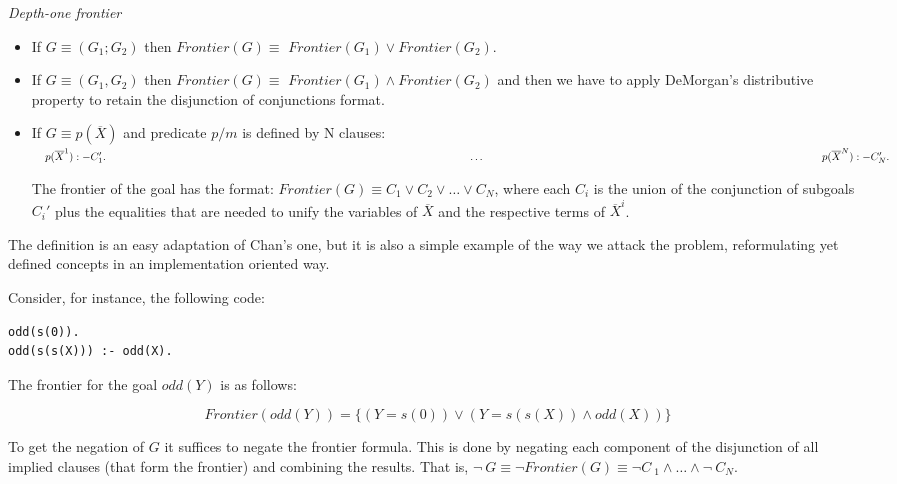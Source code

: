 \documentclass{llncs}
\begin{document}
\begin{definition}{\em Depth-one frontier}

    \begin{itemize} 

\item If $G \equiv (G_1;G_2) $ then $Frontier(G) \equiv$
$Frontier(G_1) \vee Frontier(G_2)$.

\item If $G \equiv (G_1,G_2) $ then $Frontier(G) \equiv$
  $Frontier(G_1) \wedge Frontier(G_2)$ and then we have to apply
  DeMorgan's distributive property to retain the disjunction
  of conjunctions format.
  
\item If $G \equiv p( \overline{X}) $ and 
  predicate $p/m$ is defined by N clauses: $~~~p( \overline{X}^1):- C_1'. \\
~~~~~~~~~~~~~~~~~~~~~~~~~~~~~~~~~~~~~~~~~~~~~~~~~~~~~~~~~~~~~~~~~~~~~~~~~~~~~~~~~~~~~~~~~~~~~~~~~~~~~~\ldots \\
~~~~~~~~~~~~~~~~~~~~~~~~~~~~~~~~~~~~~~~~~~~~~~~~~~~~~~~~~~~~~~~~~~~~~~~~~~~~~~~~~~~~~~~~~~~~~~~p( \overline{X}^N):- C_N'. \\
$

The frontier of the goal has the format: $Frontier(G) \equiv C_1
\vee C_2 \vee \ldots \vee C_N$, where each $C_i$ is the union of the
conjunction of subgoals $C_i'$ plus the equalities that are needed to
unify the variables of $\overline{X}$ and the respective terms of
$\overline{X}^i$.

    \end{itemize}

\end{definition}

The definition is an easy adaptation of Chan's one, but it is also a
simple example of the way we attack the problem, reformulating yet
defined concepts in an implementation oriented way.

\noindent
Consider, for instance, the following code:
{\small
\begin{verbatim}
odd(s(0)).
odd(s(s(X))) :- odd(X).
\end{verbatim}
}
The frontier for the goal $odd (Y)$ is as follows:

\[Frontier(odd(Y)) = \{ ( Y=s(0) ) \vee ( Y=s(s(X)) \wedge odd(X) ) \} \] 

To get the negation of $G$ it suffices to negate the frontier
formula. This is done by negating each component of the disjunction of
all implied clauses (that form the frontier) and combining the
results. That is, $\neg ~ G \equiv \neg Frontier(G) \equiv \neg C~ _1
\wedge \ldots \wedge \neg~  C_N$.
\end{document}
